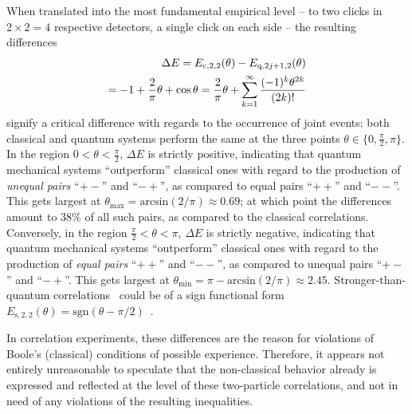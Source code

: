 When translated into the most fundamental empirical level
-- to two clicks in $2\times 2 =4$ respective detectors, a single click on each side -- the resulting differences
\begin{equation}
\begin{split}
\Delta E = E_{\text{c},2,2}(\theta ) - E_{\text{q},2j+1,2}(\theta ) \\
= -1 + {2 \over \pi}\theta + \cos \theta
= {2 \over \pi}\theta + \sum_{k=1}^\infty \frac{(-1)^k \theta^{2k}}{(2k)!}
\label{2017-b-ch-diffev}
\end{split}
\end{equation}
signify a critical difference
with regards to the occurrence of joint events:
both classical and quantum systems perform the same at the three points
$\theta \in \{0, \frac{\pi}{2},\pi\}$.
In the region
$0 < \theta <\frac{\pi}{2}$,
$\Delta E $ is strictly positive, indicating that quantum mechanical systems ``outperform''
classical ones with regard to the production of {\em unequal pairs} ``$+-$''  and ``$-+$'',
as compared to equal pairs  ``$++$''  and ``$--$''.
This gets largest at $\theta_{\text{max}}=\text{arcsin}({2}/{\pi}) \approx 0.69$;
at which point the differences amount to 38\%
of all such pairs, as compared to the classical correlations.
Conversely,
in the region
$ \frac{\pi}{2} < \theta <\pi $,
$\Delta E $ is strictly negative, indicating that quantum mechanical systems ``outperform''
classical ones with regard to the production of {\em  equal pairs} ``$++$''  and ``$--$'',
as compared to unequal pairs   ``$+-$''  and ``$-+$''.
This gets largest at $\theta_{\text{min}}= \pi -\text{arcsin}({2}/{\pi}) \approx 2.45$.
Stronger-than-quantum correlations~\cite{popescu-97,popescu-2014} could be of a sign functional form
$
E_{\text{s},2,2}(\theta )= \text{sgn} (\theta-\pi /2 )
$~\cite{svozil-krenn}.

In correlation experiments, these differences are the reason for violations of Boole's
(classical) conditions of possible experience.
Therefore, it appears not entirely unreasonable to speculate that
the non-classical behavior already is expressed and reflected at the level of these two-particle correlations,
and not in need of any violations of the resulting inequalities.


